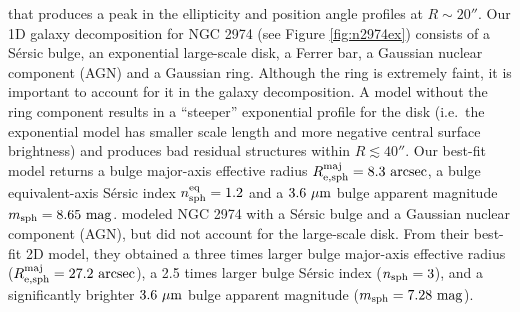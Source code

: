 \documentclass[preprint2]{emulateapj}
\begin{document}
that produces a peak in the ellipticity and position angle profiles at $R \sim 20''$.
Our 1D galaxy decomposition for NGC 2974 (see Figure \ref{fig:n2974ex}) consists of a S\'ersic bulge, an exponential large-scale disk,
a Ferrer bar, a Gaussian nuclear component (AGN) and a Gaussian ring.
Although the ring is extremely faint, it is important to account for it in the galaxy decomposition. 
A model without the ring component results in a ``steeper'' exponential profile for the disk 
(i.e.~the exponential model has smaller scale length and more negative central surface brightness) 
and produces bad residual structures within $R \lesssim 40''$.
Our best-fit model returns a bulge major-axis effective radius $R_{\rm e,sph}^{\rm maj} = 8.3\rm~arcsec$, 
a bulge equivalent-axis S\'ersic index $n_{\rm sph}^{\rm eq} = 1.2$ and a $3.6~\rm \mu m$ bulge apparent magnitude $m_{\rm sph} = 8.65~\rm mag$.
\cite{sani2011} modeled NGC 2974 with a S\'ersic bulge and a Gaussian nuclear component (AGN), 
but did not account for the large-scale disk.
From their best-fit 2D model, they obtained a three times larger bulge major-axis effective radius ($R_{\rm e,sph}^{\rm maj} = 27.2\rm~arcsec$), 
a 2.5 times larger bulge S\'ersic index ($n_{\rm sph} = 3$),
and a significantly brighter $3.6~\rm \mu m$ bulge apparent magnitude ($m_{\rm sph} = 7.28~\rm mag$).


\end{document}
